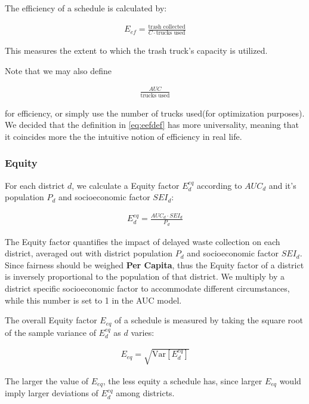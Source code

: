\documentclass{article}
\begin{document}
The efficiency of a schedule is calculated by:

\begin{align}
    E_{ef} = \frac{\mbox{trash collected}}{C \cdot \mbox{trucks used}} \label{eq:eefdef}
\end{align}

This measures the extent to which the trash truck’s capacity is utilized.

Note that we may also define

\begin{align}
    \frac{AUC}{\mbox{trucks used}}
\end{align}



for efficiency, or simply use the number of trucks used(for optimization purposes). We decided that the definition in \cref{eq:eefdef} has more universality, meaning that it coincides more the the intuitive notion of efficiency in real life.

\subsubsection{Equity}

For each district $d$, we calculate a Equity factor $E^{eq}_d$ according to $AUC_d$ and it's population $P_d$ and socioeconomic factor $SEI_d$:

\begin{align}
    E^{eq}_d = \frac{AUC_d \cdot SEI_d}{P_d}
\end{align}

The Equity factor quantifies the impact of delayed waste collection on each district, averaged out with district population $P_d$ and socioeconomic factor $SEI_d$. Since fairness should be weighed \textbf{Per Capita}, thus the Equity factor of a district is inversely proportional to the population of that district. We multiply by a district specific socioeconomic factor to accommodate different circumstances, while this number is set to 1 in the AUC model.

The overall Equity factor $E_{eq}$ of a schedule is measured by taking the square root of the sample variance of $E_d^{eq}$ as $d$ varies:

\begin{align}
    E_{eq} = \sqrt{\mbox{Var}[E_d^{eq}]}
\end{align}

The larger the value of $E_{eq}$, the less equity a schedule has, since larger $E_{eq}$ would imply larger deviations of $E^{eq}_d$ among districts.
\end{document}
